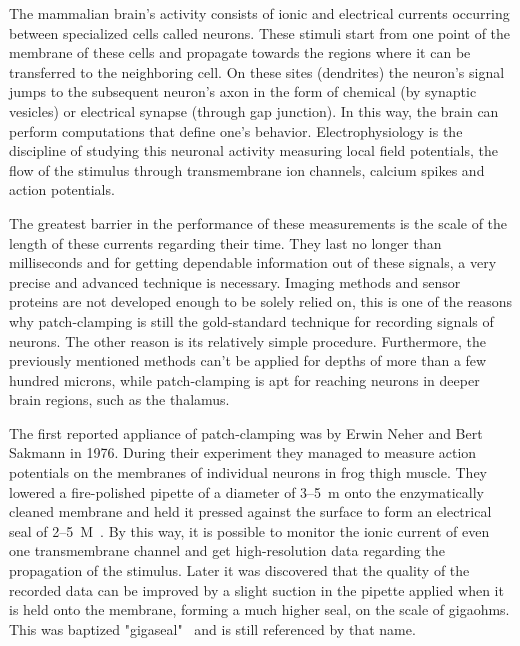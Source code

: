 \documentclass[12pt,a4paper]{report}
\begin{document}
The mammalian brain's activity consists of ionic and electrical currents occurring between specialized cells called neurons. These stimuli start from one point of the membrane of these cells and propagate towards the regions where it can be transferred to the neighboring cell. On these sites (dendrites) the neuron's signal jumps to the subsequent neuron's axon in the form of chemical (by synaptic vesicles) or electrical synapse (through gap junction). In this way, the brain can perform computations that define one's behavior. Electrophysiology is the discipline of studying this neuronal activity measuring local field potentials, the flow of the stimulus through transmembrane ion channels, calcium spikes and action potentials.\par
The greatest barrier in the performance of these measurements is the scale of the length of these currents regarding their time. They last no longer than milliseconds and for getting dependable information out of these signals, a very precise and advanced technique is necessary. Imaging methods and sensor proteins are not developed enough to be solely relied on, this is one of the reasons why patch-clamping is still the gold-standard technique for recording signals of neurons. The other reason is its relatively simple procedure. Furthermore, the previously mentioned methods can't be applied for depths of more than a few hundred microns, while patch-clamping is apt for reaching neurons in deeper brain regions, such as the thalamus.\par
The first reported appliance of patch-clamping was by Erwin Neher and Bert Sakmann in 1976. During their experiment they managed to measure action potentials on the membranes of individual neurons in frog thigh muscle. They lowered a fire-polished pipette of a diameter of 3--5~\textmu m onto the enzymatically cleaned membrane and held it pressed against the surface to form an electrical seal of 2--5~M\textOmega~\cite{neher1976}. By this way, it is possible to monitor the ionic current of even one transmembrane channel and get high-resolution data regarding the propagation of the stimulus. Later it was discovered that the quality of the recorded data can be improved by a slight suction in the pipette applied when it is held onto the membrane, forming a much higher seal, on the scale of gigaohms. This was baptized "gigaseal"~\cite{hamill1981} and is still referenced by that name.
\end{document}
